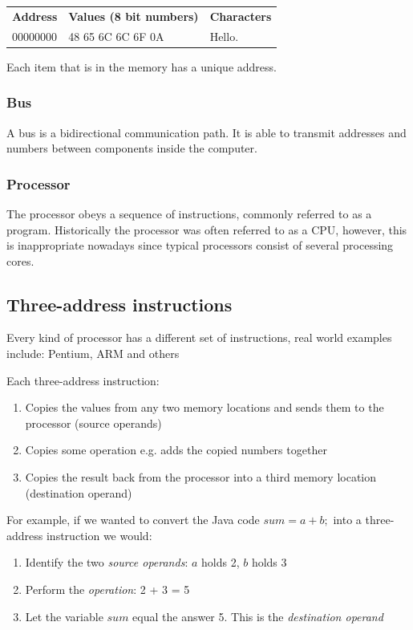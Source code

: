 \documentclass{article}
\begin{document}
\begin{tabular}{l l l}
	{\bf Address}     &	{\bf Values (8 bit numbers)}	&	{\bf Characters}\\
	00000000	&	48 65 6C 6C 6F 0A		&	Hello.\\
\end{tabular}

Each item that is in the memory has a unique address.

\subsubsection{Bus}
A bus is a bidirectional communication path. It is able to transmit addresses and numbers between components inside the computer.

\subsubsection{Processor}
The processor obeys a sequence of instructions, commonly referred to as a program.
Historically the processor was often referred to as a CPU, however, this is inappropriate nowadays since typical processors consist of several processing cores.

\subsection{Three-address instructions}
Every kind of processor has a different set of instructions, real world examples include: Pentium, ARM and others

Each three-address instruction:
\begin{enumerate}
	\item Copies the values from any two memory locations and sends them to the processor (source operands)
	\item Copies some operation e.g. adds the copied numbers together
	\item Copies the result back from the processor into a third memory location (destination operand)
\end{enumerate}

For example, if we wanted to convert the Java code $sum = a + b;$ into a three-address instruction we would:
\begin{enumerate}
	\item Identify the two {\it source operands}: $a$ holds 2, $b$ holds 3
	\item Perform the {\it operation}: 2 + 3 = 5
	\item Let the variable $sum$ equal the answer 5. This is the {\it destination operand}
\end{enumerate}
\end{document}
